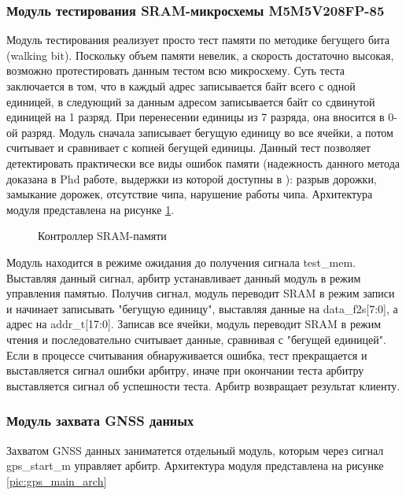 \subsubsection{Модуль тестирования SRAM-микросхемы M5M5V208FP-85}
\label{sec:test_sram}
Модуль тестирования реализует просто тест памяти по методике бегущего бита (walking bit). Поскольку объем памяти невелик, а скорость
достаточно высокая, возможно протестировать данным тестом всю микросхему. Суть теста заключается в том, что в каждый адрес записывается
байт всего с одной единицей, в следующий за данным адресом записывается байт со сдвинутой единицей на 1 разряд. При перенесении единицы
из 7 разряда, она вносится в 0-ой разряд. Модуль сначала записывает бегущую единицу во все ячейки, а потом считывает и сравнивает с
копией бегущей единицы. Данный тест позволяет детектировать практически все виды ошибок памяти
(надежность данного метода доказана в Phd работе, выдержки из которой доступны в \cite{fast_mem_test}):
разрыв дорожки, замыкание дорожек, отсутствие чипа, нарушение работы чипа. Архитектура модуля представлена на рисунке
\ref{pic:test_sram_arch}.

\begin{figure}[H]
\begin{center}
\end{center}
\caption{Контроллер SRAM-памяти}
\label{pic:test_sram_arch}
\end{figure}

Модуль находится в режиме ожидания до получения сигнала test\_mem. Выставляя данный сигнал, арбитр устанавливает данный модуль
в режим управления памятью. Получив сигнал, модуль переводит SRAM в режим записи и начинает записывать "бегущую единицу",
выставляя данные на data\_f2s[7:0], а адрес на addr\_t[17:0]. Записав все ячейки, модуль переводит SRAM в режим чтения и последовательно
считывает данные, сравнивая с "бегущей единицей". Если в процессе считывания обнаруживается ошибка, тест прекращается и 
выставляется сигнал ошибки арбитру, иначе при окончании теста арбитру выставляется сигнал об успешности теста. Арбитр возвращает
результат клиенту.

\subsubsection{Модуль захвата GNSS данных}
\label{sec:gps_acq}
Захватом GNSS данных заниматется отдельный модуль, которым через сигнал gps\_start\_m управляет арбитр. Архитектура модуля
представлена на рисунке \ref{pic:gps_main_arch}

